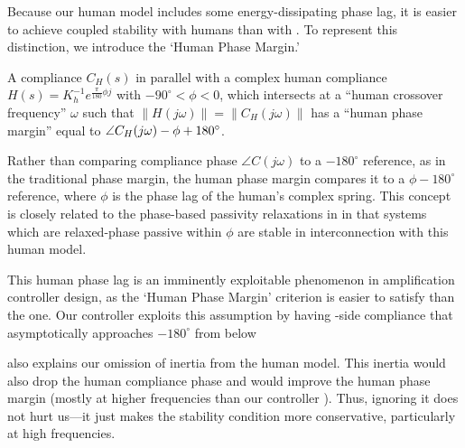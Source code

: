Because our human model includes some energy-dissipating phase lag, it is easier to achieve coupled stability with humans than with . To represent this distinction, we introduce the `Human Phase Margin.'
\begin{definition}
	A compliance $C_H(s)$ in parallel with a complex human compliance $H(s) = K_h^{-1} e^{\frac{\pi}{180}\phi j}$ with  $-90^\circ<\phi<0$\ta, which intersects at a ``human crossover frequency'' $\omega$ such that $\|H(j\omega)\| = \|C_H(j\omega)\|$ has a ``human phase margin'' equal to $\angle C_H(j\omega)-\phi +180^\circ$.
\end{definition}
Rather than comparing compliance phase $\angle C(j\omega)$ to a $-180^\circ$ reference, as in the traditional phase margin, the human phase margin compares it to a $\phi-180^\circ$ reference, where $\phi$ is the phase lag of the human's complex spring. This concept is closely related to the phase-based passivity relaxations in \cite{ThomasCoholichSentis2019AIM,ThomasMehlingHolleySentisTMechEA} in that systems which are relaxed-phase passive within $\phi$ are stable in interconnection with this human model.

This human phase lag is an imminently exploitable phenomenon in amplification controller design, as the `Human Phase Margin' criterion is easier to satisfy than the  one. Our controller exploits this assumption by having -side compliance that asymptotically approaches $-180^\circ$ from below 

 also explains our omission of inertia from the human model. This inertia would also drop the human compliance phase and would improve the human phase margin (mostly at higher frequencies than our controller ). Thus, ignoring it does not hurt us---it just makes the stability condition more conservative, particularly at high frequencies. 






